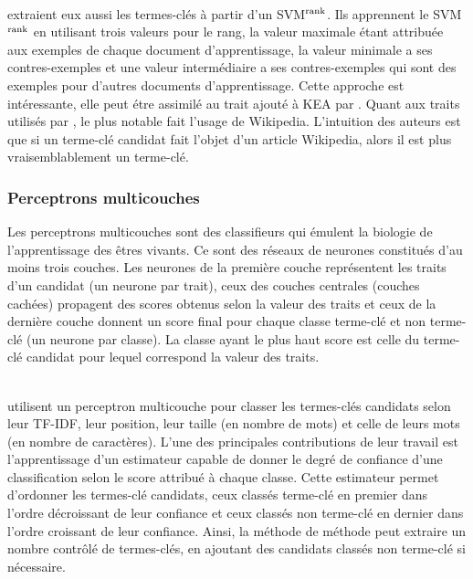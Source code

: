         ~\\ extraient eux aussi les termes-clés à
        partir d'un SVM$^\textnormal{rank}$. Ils apprennent le
        SVM$^\textnormal{rank}$ en utilisant trois valeurs pour le rang, la
        valeur maximale étant attribuée aux exemples de chaque document
        d'apprentissage, la valeur minimale a ses contres-exemples et une valeur
        intermédiaire a ses contres-exemples qui sont des exemples pour d'autres
        documents d'apprentissage. Cette approche est intéressante, elle peut
        étre assimilé au trait ajouté à KEA par .
        Quant aux traits utilisés par , le plus
        notable fait l'usage de Wikipedia. L'intuition des auteurs est que si un
        terme-clé candidat fait l'objet d'un article Wikipedia, alors il est
        plus vraisemblablement un terme-clé.

      \subsubsection{Perceptrons multicouches}
      \label{subsubsec:main-state_of_the_art-automatic_keyphrase_extraction-supervised_keyphrase_extraction-neural_network}
        Les perceptrons multicouches sont des classifieurs qui émulent la
        biologie de l'apprentissage des êtres vivants. Ce sont des réseaux de
        neurones constitués d'au moins trois couches. Les neurones de la
        première couche représentent les traits d'un candidat (un neurone par
        trait), ceux des couches centrales (couches cachées) propagent des
        scores obtenus selon la valeur des traits et ceux de la dernière couche
        donnent un score final pour chaque classe \og{}terme-clé\fg{} et
        \og{}non terme-clé\fg{} (un neurone par classe). La classe ayant le plus
        haut score est celle du terme-clé candidat pour lequel correspond la
        valeur des traits.
        
        ~\\ utilisent un perceptron multicouche
        pour classer les termes-clés candidats selon leur TF-IDF, leur position,
        leur taille (en nombre de mots) et celle de leurs mots (en nombre de
        caractères). L'une des principales contributions de leur travail est
        l'apprentissage d'un estimateur capable de donner le degré de confiance
        d'une classification selon le score attribué à chaque classe. Cette
        estimateur permet d'ordonner les termes-clé candidats, ceux classés
        \og{}terme-clé\fg{} en premier dans l'ordre décroissant de leur
        confiance et ceux classés \og{}non terme-clé\fg{} en dernier dans
        l'ordre croissant de leur confiance. Ainsi, la méthode de
         méthode peut extraire un nombre
        contrôlé de termes-clés, en ajoutant des candidats classés \og{}non
        terme-clé\fg{} si nécessaire.

